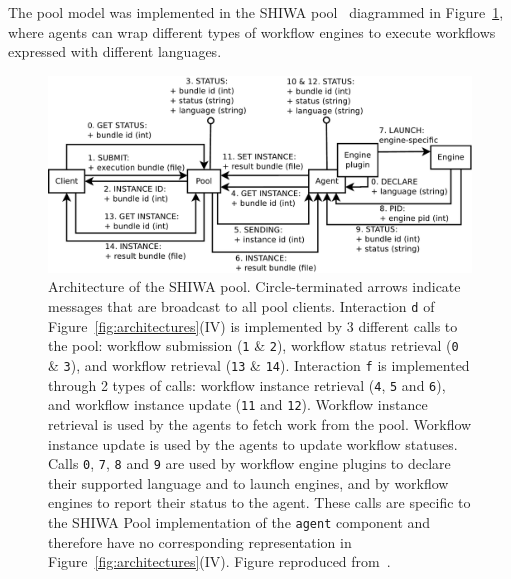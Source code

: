 \documentclass[preprint,3p,twocolumn]{elsarticle}
\begin{document}
The pool model was implemented in the SHIWA pool~\cite{ROGE-13}
diagrammed in Figure~\ref{fig:shiwa-pool-architecture}, where agents
can wrap different types of workflow engines to execute workflows
expressed with different languages.


\begin{figure}
\centering
\includegraphics[width=1.5\columnwidth]{figures/pool-interactions.pdf}
\caption{Architecture of the SHIWA pool. Circle-terminated arrows
  indicate messages that are broadcast to all pool
  clients. Interaction \texttt{d} of Figure~\ref{fig:architectures}(IV) is
  implemented by 3 different calls to the pool: workflow
  submission (\texttt{1} \& \texttt{2}), workflow status retrieval
  (\texttt{0} \& \texttt{3}), and workflow
  retrieval (\texttt{13} \& \texttt{14}). Interaction
  \texttt{f} is implemented through 2 types of calls: workflow
  instance retrieval (\texttt{4}, \texttt{5} and \texttt{6}), and
  workflow instance update (\texttt{11} and \texttt{12}). Workflow
  instance retrieval is used by the agents to fetch work from the
  pool. Workflow instance update is used by the agents to update
  workflow statuses.  Calls \texttt{0}, \texttt{7}, \texttt{8} and
  \texttt{9} are used by
  workflow engine plugins to declare their supported language and to
  launch engines, and by workflow engines to report their status to
  the agent. These calls are specific to the SHIWA Pool implementation
  of the \texttt{agent} component and therefore have no corresponding
  representation in Figure~\ref{fig:architectures}(IV). Figure reproduced
  from~\cite{ROGE-13}.}
\label{fig:shiwa-pool-architecture}
\end{figure}
\end{document}
